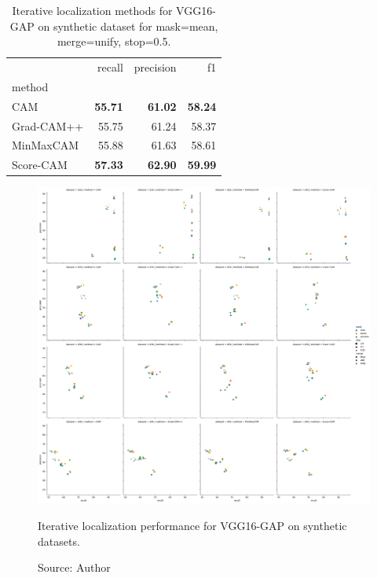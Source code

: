 \begin{table}[ht]
\centering
\begin{tabular}{lrrr}
\toprule
 & recall & precision & f1 \\
method &  &  &  \\
\cmidrule(lr){1-1} \cmidrule(lr){2-4}
CAM & \color{purple} \bfseries 55.71 & \color{purple} \bfseries 61.02 & \color{purple} \bfseries 58.24 \\
Grad-CAM++ & 55.75 & 61.24 & 58.37 \\
MinMaxCAM & 55.88 & 61.63 & 58.61 \\
Score-CAM & \color{teal} \bfseries 57.33 & \color{teal} \bfseries 62.90 & \color{teal} \bfseries 59.99 \\
\bottomrule
\end{tabular}
\caption[Iterative localization methods for VGG16-GAP on synthetic dataset]{Iterative localization methods for VGG16-GAP on synthetic dataset for mask=mean, merge=unify, stop=0.5.}
\label{tab:iter_metrics_vgg16_cam_synthetic_all}
\end{table}

\begin{figure}[ht]
    \begin{center}       
    \includegraphics[width=1.0\textwidth]{images/fig_iter_vgg16_gap_synthetic.png}
    \caption[Iterative localization performance for VGG16-GAP on synthetic datasets]{Iterative localization performance for VGG16-GAP on synthetic datasets.}
    \caption*{Source: Author}
    \label{fig:prec_iter_vgg16_gap_synthetic}
    \end{center}
\end{figure}

